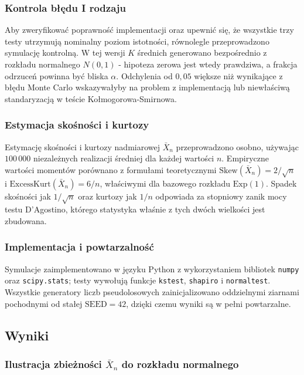 \documentclass[12pt,a4paper]{article}
\begin{document}
\subsubsection{Kontrola błędu I rodzaju}

Aby zweryfikować poprawność implementacji oraz upewnić się, że wszystkie trzy testy utrzymują nominalny poziom istotności, równolegle przeprowadzono symulację kontrolną. W tej wersji $K$ średnich generowano bezpośrednio z rozkładu normalnego $N(0, 1)$ - hipoteza zerowa jest wtedy prawdziwa, a frakcja odrzuceń powinna być bliska $\alpha$. Odchylenia od $0{,}05$ większe niż wynikające z błędu Monte Carlo wskazywałyby na problem z implementacją lub niewłaściwą standaryzacją w teście Kołmogorowa-Smirnowa.

\subsubsection{Estymacja skośności i kurtozy}

Estymację skośności i kurtozy nadmiarowej $\bar{X}_n$ przeprowadzono osobno, używając $100\,000$ niezależnych realizacji średniej dla każdej wartości $n$. Empiryczne wartości momentów porównano z formułami teoretycznymi $\mathrm{Skew}(\bar{X}_n) = 2/\sqrt{n}$ i $\mathrm{ExcessKurt}(\bar{X}_n) = 6/n$, właściwymi dla bazowego rozkładu $\mathrm{Exp}(1)$. Spadek skośności jak $1/\sqrt{n}$ oraz kurtozy jak $1/n$ odpowiada za stopniowy zanik mocy testu D'Agostino, którego statystyka właśnie z tych dwóch wielkości jest zbudowana.

\subsubsection{Implementacja i powtarzalność}

Symulacje zaimplementowano w języku Python z wykorzystaniem bibliotek \texttt{numpy} oraz \texttt{scipy.stats}; testy wywołują funkcje \texttt{kstest}, \texttt{shapiro} i \texttt{normaltest}. Wszystkie generatory liczb pseudolosowych zainicjalizowano oddzielnymi ziarnami pochodnymi od stałej $\mathrm{SEED} = 42$, dzięki czemu wyniki są w pełni powtarzalne.

\subsection{Wyniki}

\subsubsection{Ilustracja zbieżności $\bar{X}_n$ do rozkładu normalnego}
\end{document}
